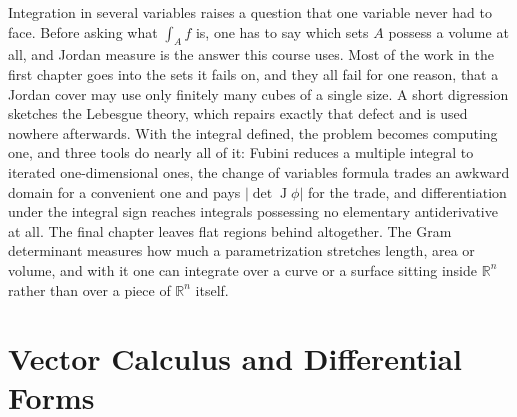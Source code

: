 \documentclass{report}
\theoremstyle{purplethm}
\theoremstyle{purplethm}
\theoremstyle{defthm}
\theoremstyle{examplethm}
\theoremstyle{questionthm}
\theoremstyle{remarkthm}
\theoremstyle{asidethm}
\theoremstyle{importantremarkthm}
\theoremstyle{remarkthm}
\theoremstyle{ainotethm}
\theoremstyle{purplethm}
\DeclareMathOperator{\Jac}{J}
\begin{document}
Integration in several variables raises a question that one variable never had to face. Before
asking what $\int_A f$ is, one has to say which sets $A$ possess a volume at all, and Jordan
measure is the answer this course uses. Most of the work in the first chapter goes into the sets
it fails on, and they all fail for one reason, that a Jordan cover may use only finitely many
cubes of a single size. A short digression sketches the Lebesgue theory, which repairs exactly
that defect and is used nowhere afterwards. With the integral defined, the problem becomes
computing one, and three tools do nearly all of it: Fubini reduces a multiple integral to iterated
one-dimensional ones, the change of variables formula trades an awkward domain for a convenient
one and pays $\lvert\det \Jac\phi\rvert$ for the trade, and differentiation under the integral
sign reaches integrals possessing no elementary antiderivative at all. The final chapter leaves
flat regions behind altogether. The Gram determinant measures how much a parametrization stretches
length, area or volume, and with it one can integrate over a curve or a surface sitting inside
$\mathbb{R}^n$ rather than over a piece of $\mathbb{R}^n$ itself.





\part{Vector Calculus and Differential Forms}
\end{document}
